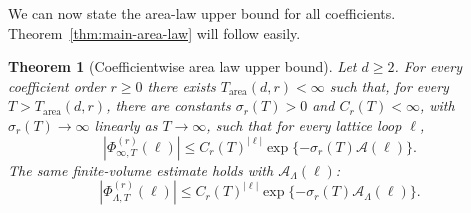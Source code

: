 \documentclass[11pt,a4paper,reqno]{amsart}
\newtheorem{theorem}{Theorem}[section]
\theoremstyle{definition}
\theoremstyle{remark}
\begin{document}
We can now state the area-law upper bound for all coefficients. Theorem~\ref{thm:main-area-law} will follow easily.

\begin{theorem}[Coefficientwise area law upper bound]
\label{thm:area-law}
Let $d\ge2$.  For every coefficient order $r\ge0$ there exists $T_{\mathrm{area}}(d,r)<\infty$ such that, for every $T>T_{\mathrm{area}}(d,r)$, there are constants $\sigma_r(T)>0$ and $C_r(T)<\infty$, with $\sigma_r(T)\to\infty$ linearly as $T\to\infty$, such that for every lattice loop $\ell$,
\begin{equation}\label{eq:infinite-volume-arealaw}
\left|
\Phi_{\infty,T}^{(r)}(\ell)
\right|
\le
C_r(T)^{|\ell|}
\exp\{-\sigma_r(T)\mathcal A(\ell)\}.
\end{equation}
The same finite-volume estimate holds with $\mathcal A_\Lambda(\ell)$:
\begin{equation}\label{eq:finite-volume-arealaw}
\left|\Phi_{\Lambda,T}^{(r)}(\ell)\right|\le C_r(T)^{|\ell|}\exp\{-\sigma_r(T)\mathcal A_\Lambda(\ell)\}.
\end{equation}
\end{theorem}
\end{document}
